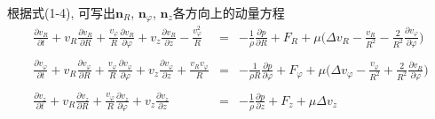 \begin{solution}
\begin{enumerate}
\end{enumerate}
根据式(1-4), 可写出$\mathbf{n}_R$, $\mathbf{n}_\varphi$, $\mathbf{n}_z$各方向上的动量方程
{\setlength\arraycolsep{2pt}
\begin{eqnarray}
\frac{\partial v_R}{\partial t}  +
v_R\frac{\partial v_R}{\partial R} +
\frac{v_\varphi}{R}\frac{\partial v_R}{\partial\varphi}+
v_z\frac{\partial v_R}{\partial z} -
\frac{v_\varphi^2}{R}
& = &
-\frac{1}{\rho}\frac{\partial p}{\partial R} + F_R + \mu\Big(
\Delta v_R-
\frac{v_R}{R^2}-
\frac{2}{R^2}\frac{\partial v_\varphi}{\partial\varphi}
\Big)\nonumber\\
\nonumber\\
\frac{\partial v_\varphi}{\partial t}+
v_R\frac{\partial v_\varphi}{\partial R}+
\frac{v_\varphi}{R}\frac{\partial v_\varphi}{\partial\varphi}+
v_z\frac{\partial v_\varphi}{\partial z} +
\frac{v_Rv_\varphi}{R}
& = &
-\frac{1}{\rho R}\frac{\partial p}{\partial\varphi} + F_\varphi + \mu\Big(
\Delta v_\varphi-
\frac{v_\varphi}{R^2}+
\frac{2}{R^2}\frac{\partial v_R}{\partial\varphi}
\Big)\nonumber\\
\nonumber\\
\frac{\partial v_z}{\partial t}+
v_R\frac{\partial v_z}{\partial R}+
\frac{v_\varphi}{R}\frac{\partial v_z}{\partial\varphi}+
v_z\frac{\partial v_z}{\partial z}
& = &
-\frac{1}{\rho}\frac{\partial p}{\partial z} + F_z + \mu\Delta v_z\nonumber
\end{eqnarray}}


\end{solution}
